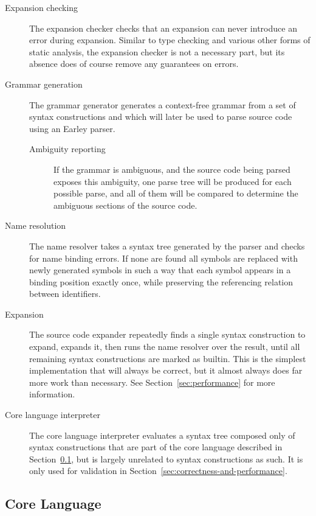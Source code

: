 \documentclass{kththesis}
\begin{document}
\begin{description}
  \item[Expansion checking] The expansion checker checks that an expansion can never introduce an error during expansion. Similar to type checking and various other forms of static analysis, the expansion checker is not a necessary part, but its absence does of course remove any guarantees on errors.

  \item[Grammar generation] The grammar generator generates a context-free grammar from a set of syntax constructions and which will later be used to parse source code using an Earley \cite{Earley1970An-Efficient-Co} parser.
  \begin{description}
    \item[Ambiguity reporting] If the grammar is ambiguous, and the source code being parsed exposes this ambiguity, one parse tree will be produced for each possible parse, and all of them will be compared to determine the ambiguous sections of the source code.
  \end{description}

  \item[Name resolution] The name resolver takes a syntax tree generated by the parser and checks for name binding errors. If none are found all symbols are replaced with newly generated symbols in such a way that each symbol appears in a binding position exactly once, while preserving the referencing relation between identifiers.

  \item[Expansion] The source code expander repeatedly finds a single syntax construction to expand, expands it, then runs the name resolver over the result, until all remaining syntax constructions are marked as builtin. This is the simplest implementation that will always be correct, but it almost always does far more work than necessary. See Section~\ref{sec:performance} for more information.

  \item[Core language interpreter] The core language interpreter evaluates a syntax tree composed only of syntax constructions that are part of the core language described in Section~\ref{sec:core-language}, but is largely unrelated to syntax constructions as such. It is only used for validation in Section~\ref{sec:correctness-and-performance}.
\end{description}

\subsection{Core Language} \label{sec:core-language}
\end{document}

